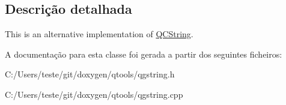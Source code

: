 \subsection{Descrição detalhada}
This is an alternative implementation of \hyperlink{class_q_c_string}{Q\-C\-String}. 

A documentação para esta classe foi gerada a partir dos seguintes ficheiros\-:\begin{DoxyCompactItemize}
\item 
C\-:/\-Users/teste/git/doxygen/qtools/qgstring.\-h\item 
C\-:/\-Users/teste/git/doxygen/qtools/qgstring.\-cpp\end{DoxyCompactItemize}
